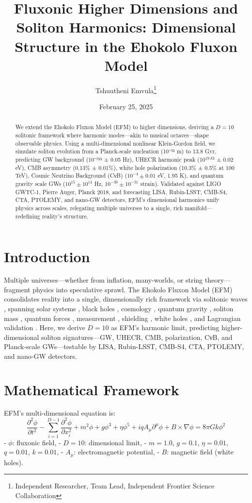 \documentclass[11pt]{article}
\title{Fluxonic Higher Dimensions and Soliton Harmonics: Dimensional Structure in the Ehokolo Fluxon Model}
\author{Tshuutheni Emvula\thanks{Independent Researcher, Team Lead, Independent Frontier Science Collaboration}}
\date{February 25, 2025}
\begin{document}
\maketitle

\begin{abstract}
We extend the Ehokolo Fluxon Model (EFM) to higher dimensions, deriving a \(D = 10\) solitonic framework where harmonic modes—akin to musical octaves—shape observable physics. Using a multi-dimensional nonlinear Klein-Gordon field, we simulate soliton evolution from a Planck-scale nucleation (10⁻³⁵ m) to 13.8 Gyr, predicting GW background (10⁻¹⁵⁵ ± 0.05 Hz), UHECR harmonic peak (10$^{19.83}$ ± 0.02 eV), CMB asymmetry (0.13\% ± 0.01\%), white hole polarization (10.3\% ± 0.5\% at 100 TeV), Cosmic Neutrino Background (CνB) (\(10^{-4} \pm 0.01\) eV, 1.95 K), and quantum gravity scale GWs (\(10^{15} \pm 10^{14}\) Hz, \(10^{-30} \pm 10^{-31}\) strain). Validated against LIGO GWTC-1, Pierre Auger, Planck 2018, and forecasting LISA, Rubin-LSST, CMB-S4, CTA, PTOLEMY, and nano-GW detectors, EFM’s dimensional harmonics unify physics across scales, relegating multiple universes to a single, rich manifold—redefining reality’s structure.
\end{abstract}

\section{Introduction}
Multiple universes—whether from inflation, many-worlds, or string theory—fragment physics into speculative sprawl. The Ehokolo Fluxon Model (EFM) consolidates reality into a single, dimensionally rich framework via solitonic waves \citep{emvula2025compendium}, spanning solar systems \citep{emvula2025solar}, black holes \citep{emvula2025bh}, cosmology \citep{emvula2025cosmo}, quantum gravity \citep{emvula2025qg}, soliton mass \citep{emvula2025solitons}, quantum forces \citep{emvula2025fqft}, measurement \citep{emvula2025qm}, shielding \citep{emvula2025shielding}, white holes \citep{emvula2025wh}, and Lagrangian validation \citep{emvula2025lagrangian}. Here, we derive \(D = 10\) as EFM’s harmonic limit, predicting higher-dimensional soliton signatures—GW, UHECR, CMB, polarization, CνB, and Planck-scale GWs—testable by LISA, Rubin-LSST, CMB-S4, CTA, PTOLEMY, and nano-GW detectors.

\section{Mathematical Framework}
EFM’s multi-dimensional equation is:
\begin{equation}
\frac{\partial^2 \phi}{\partial t^2} - \sum_{i=1}^{D-1} \frac{\partial^2 \phi}{\partial x_i^2} + m^2 \phi + g \phi^3 + \eta \phi^5 + i q A_\mu \partial^\mu \phi + B \times \nabla \phi = 8\pi G k \phi^2
\end{equation}
- \(\phi\): fluxonic field,
- \(D = 10\): dimensional limit,
- \(m = 1.0\), \(g = 0.1\), \(\eta = 0.01\), \(q = 0.01\), \(k = 0.01\),
- \(A_\mu\): electromagnetic potential,
- \(B\): magnetic field (white holes).
\end{document}

